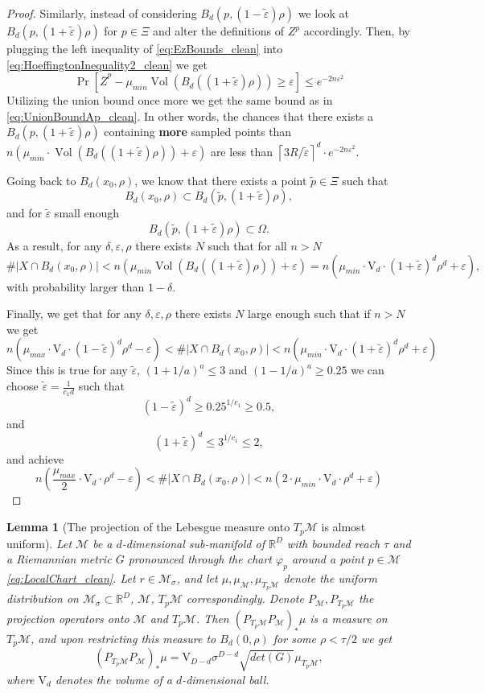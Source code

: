 \documentclass[12pt]{article}
\newtheorem{Lemma}[Theorem]{Lemma}
\theoremstyle{remark}
\newcommand{\RR}{\mathbb{R}}
\newcommand{\MM}{\mathcal{M}}
\newcommand{\eps}{\varepsilon}
\newcommand{\ceil}[1]{\left\lceil #1 \right\rceil}
\DeclareMathOperator{\vol}{Vol}
\begin{document}
\begin{appendices}
\begin{proof}
Similarly, instead of considering $B_d(p, (1-\tilde\eps)\rho)$ we look at $B_d(p, (1+\tilde\eps)\rho)$ for $p\in\Xi$ and alter the definitions of $Z^p$ accordingly.
Then, by plugging the left inequality of \eqref{eq:EzBounds_clean} into \eqref{eq:HoeffingtonInequality2_clean} we get
\[
\Pr[\overline{Z}^p - \mu_{min}\vol(B_d((1+\tilde\eps)\rho))\geq \eps] \leq e^{-2n\eps^2} 
\]
Utilizing the union bound once more we get the same bound as in \eqref{eq:UnionBoundAp_clean}. 
In other words, the chances that there exists a $B_d(p, (1+\tilde\eps)\rho)$ containing \textbf{more} sampled points than $n(\mu_{min} \cdot \vol(B_d((1+\tilde\eps)\rho)) + \eps )$ are less than $\ceil{3R/\tilde\eps}^d\cdot e^{-2n\eps^2}$.

Going back to $B_d(x_0, \rho)$, we know that there exists a point $\tilde p\in \Xi$ such that 
\[
B_d(x_0, \rho) \subset B_d(\tilde p,(1+\tilde\eps)\rho)
,\]
and for $\tilde\eps$ small enough
\[
B_d(\tilde p,(1+\tilde\eps)\rho) \subset \Omega
.\]
As a result, for any $\delta, \eps, \rho$ there exists $N$ such that for all $n>N$
\[
\#|X \cap B_d(x_0, \rho)| < n(\mu_{min}\vol(B_d((1+\tilde\eps)\rho))+\eps)
= n(\mu_{min}\cdot \mathrm{V}_d \cdot(1+\tilde\eps)^d\rho^d+\eps)
,\]
with probability larger than $1-\delta$.

Finally, we get that for any $\delta, \eps, \rho$ there exists $N$ large enough such that if $n>N$ we get
\[
n(\mu_{max}\cdot \mathrm{V}_d \cdot(1-\tilde\eps)^d\rho^d-\eps) < \#|X \cap B_d(x_0, \rho)| < n(\mu_{min}\cdot \mathrm{V}_d \cdot(1+\tilde\eps)^d\rho^d+\eps)
\]
Since this is true for any $\tilde\eps$, $(1+1/a)^a \leq 3$ and $(1-1/a)^a \geq 0.25$ we can choose $\tilde\eps = \frac{1}{c_1 d}$ such that
\[(1 - \tilde\eps)^d \geq 0.25^{1/c_1} \geq 0.5,\]
and
\[(1 + \tilde\eps)^d \leq 3^{1/c_1} \leq 2,\]
and achieve
\[
n(\frac{\mu_{max}}{2}\cdot \mathrm{V}_d \cdot\rho^d-\eps) < \#|X \cap B_d(x_0, \rho)| < n(2\cdot \mu_{min}\cdot \mathrm{V}_d \cdot\rho^d+\eps)
\]
\end{proof}

\begin{Lemma}[The projection of the Lebesgue measure onto $T_p\MM$ is almost uniform] \label{lem:measure_projecting_to_tangent_clean}
    Let $\MM$ be a $d$-dimensional sub-manifold of $\RR^D$ with bounded reach $\tau$ and a Riemannian metric $G$ pronounced through the chart $\varphi_p$ around a point $ p\in \MM $ \eqref{eq:LocalChart_clean}. 
    Let $r\in\MM_\sigma$, and let $\mu, \mu_\MM, \mu_{T_p\MM}$ denote the uniform distribution on $\MM_\sigma\subset\RR^D$, $\MM$, $T_p\MM$ correspondingly.
    Denote $P_\MM, P_{T_p\MM}$ the projection operators onto $\MM$ and $T_p\MM$.
    Then $\left(P_{T_p\MM}P_{\MM}\right)_*\mu$ is a measure on $T_p\MM$, and upon restricting this measure to $B_d(0,\rho)$ for some $\rho < \tau/2$ we get
    \[
    (P_{T_p\MM}P_\MM)_*\mu = \mathrm{V}_{D-d}\sigma^{D-d} \sqrt{det(G)}\mu_{T_p\MM}
    ,\]
    where $\mathrm{V}_d$ denotes the volume of a $d$-dimensional ball.
\end{Lemma}


\end{appendices}
\end{document}
